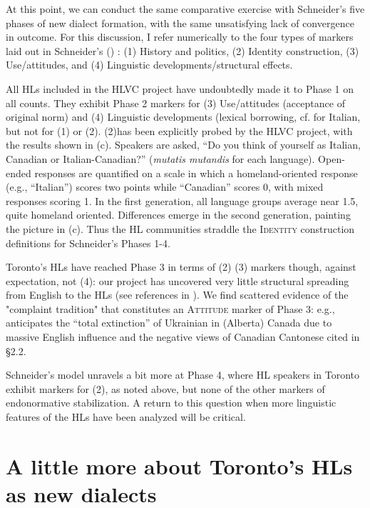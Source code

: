 \documentclass[output=paper]{LSP/langsci}
\begin{document}
At this point, we can conduct the same comparative exercise with Schneider’s five phases of new dialect formation, with the same unsatisfying lack of convergence in outcome. For this discussion, I refer numerically to the four types of markers laid out in Schneider’s (\citeyear[255]{schneider_dynamics_2003}) :  {(1) History and politics, (2) Identity construction, (3) Use/attitudes}, and { (4) Linguistic developments/structural effects.}

All HLs included in the HLVC project have undoubtedly made it to Phase 1 on all counts. They exhibit Phase 2 markers for  {(3) Use/attitudes} (acceptance of original norm) and (4) Linguistic developments (lexical borrowing, cf. \citet{danesi_canadian_1983} for Italian, but not for  (1) or  (2). (2)has been explicitly probed by the HLVC project, with the results shown in  (c). Speakers are asked, “Do you think of yourself as Italian, Canadian or Italian-Canadian?” (\textit{mutatis mutandis} for each language). Open-ended responses are quantified on a scale in which a homeland-oriented response (e.g., “Italian”) scores two points while “Canadian” scores 0, with mixed responses scoring 1. In the first generation, all language groups average near 1.5, quite homeland oriented. Differences emerge in the second generation, painting the picture in  (c). Thus the HL communities straddle the \textsc{Identity} construction definitions for Schneider’s Phases 1-4. 

\largerpage
Toronto’s HLs have reached %
 Phase 3 in terms of (2) (3) markers though, against expectation, not  (4): our project has uncovered very little structural spreading from English to the HLs (see references in ). We find scattered evidence of the "complaint tradition" that constitutes an \textsc{Attitude} marker of Phase 3: e.g., \citet{struk_between_2000} anticipates the “total extinction” of Ukrainian in (Alberta) Canada due to massive English influence and the negative views of Canadian Cantonese cited in §2.2. 

Schneider’s model unravels a bit more at Phase 4, where HL speakers in Toronto exhibit markers for (2), as noted above, but none of the other markers of endonormative stabilization. A return to this question when more linguistic features of the HLs have been analyzed will be critical.

\section{A little more about Toronto’s HLs as new dialects}
\end{document}
